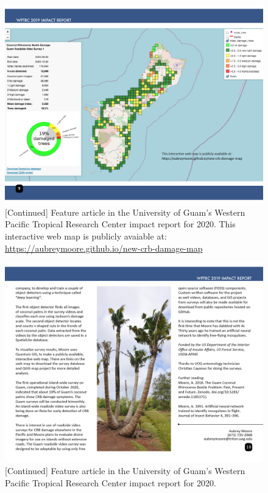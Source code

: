 \documentclass[12pt,letterpaper,english,bibliography=totocnumbered, abstract=on]{scrartcl}
\begin{document}
\begin{figure}[h]
	\centering
	\includegraphics[width=1\linewidth]{images/impact-report09.png}
	\caption{[Continued] Feature article in the University of Guam's Western Pacific Tropical Research Center impact report for 2020. This interactive web map is publicly avaiable at: \url{https://aubreymoore.github.io/new-crb-damage-map}}
	\label{fig:roadside1-3}
\end{figure}

\begin{figure}[h]
	\centering
	\includegraphics[width=1\linewidth]{images/impact-report10.png}
	\caption{[Continued] Feature article in the University of Guam's Western Pacific Tropical Research Center impact report for 2020.}
	\label{fig:roadside1-4}
\end{figure}
\end{document}

